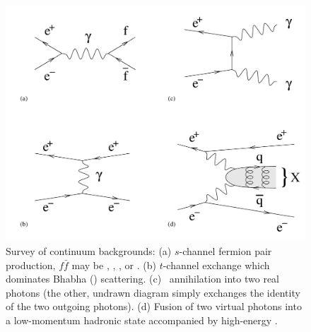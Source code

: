 \documentclass{cornell}
\begin{document}
\begin{figure}[p]
  \begin{center}
    \includegraphics[width=\linewidth]{plots/continuum}
  \end{center}
  \caption{\label{continuum} Survey of continuum backgrounds: (a)
  $s$-channel fermion pair production, $f\bar{f}$ may be \ee, \mumu,
  \tautau, or \qqbar.  (b) $t$-channel exchange which dominates Bhabha
  (\ee) scattering.  (c) \ee\ annihilation into two real photons (the
  other, undrawn diagram simply exchanges the identity of the two
  outgoing photons).  (d) Fusion of two virtual photons into a
  low-momentum hadronic state accompanied by high-energy \ee.}
\end{figure}
\end{document}
